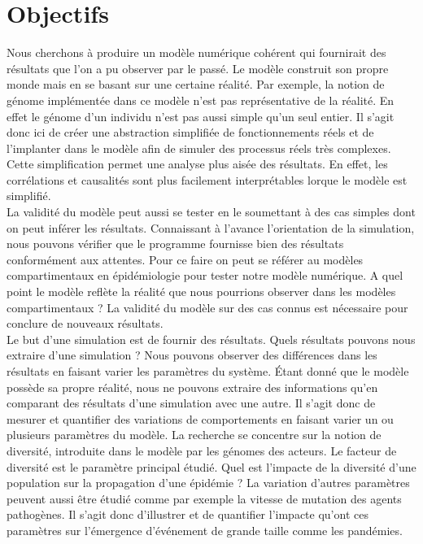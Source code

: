 \chapter{Objectifs} \label{ch:objectifs}

Nous cherchons à produire un modèle numérique cohérent qui fournirait des résultats que l'on a pu observer par le passé. Le modèle construit son propre monde mais en se basant sur une certaine réalité. Par exemple, la notion de génome implémentée dans ce modèle n'est pas représentative de la réalité. En effet le génome d'un individu n'est pas aussi simple qu'un seul entier. Il s'agit donc ici de créer une abstraction simplifiée de fonctionnements réels et de l'implanter dans le modèle afin de simuler des processus réels très complexes. Cette simplification permet une analyse plus aisée des résultats. En effet, les corrélations et causalités sont plus facilement interprétables lorque le modèle est simplifié.\\

La validité du modèle peut aussi se tester en le soumettant à des cas simples dont on peut inférer les résultats. Connaissant à l'avance l'orientation de la simulation, nous pouvons vérifier que le programme fournisse bien des résultats conformément aux attentes. Pour ce faire on peut se référer au modèles compartimentaux en épidémiologie pour tester notre modèle numérique. A quel point le modèle reflète la réalité que nous pourrions observer dans les modèles compartimentaux ? La validité du modèle sur des cas connus est nécessaire pour conclure de nouveaux résultats. \\

Le but d'une simulation est de fournir des résultats. Quels résultats pouvons nous extraire d'une simulation ? Nous pouvons observer des différences dans les résultats en faisant varier les paramètres du système. Étant donné que le modèle possède sa propre réalité, nous ne pouvons extraire des informations qu'en comparant des résultats d'une simulation avec une autre. Il s'agit donc de mesurer et quantifier des variations de comportements en faisant varier un ou plusieurs paramètres du modèle. La recherche se concentre sur la notion de diversité, introduite dans le modèle par les génomes des acteurs. Le facteur de diversité est le paramètre principal étudié. Quel est l'impacte de la diversité d'une population sur la propagation d'une épidémie ? La variation d'autres paramètres peuvent aussi être étudié comme par exemple la vitesse de mutation des agents pathogènes. Il s'agit donc d'illustrer et de quantifier l'impacte qu'ont ces paramètres sur l'émergence d'événement de grande taille comme les pandémies.\\

